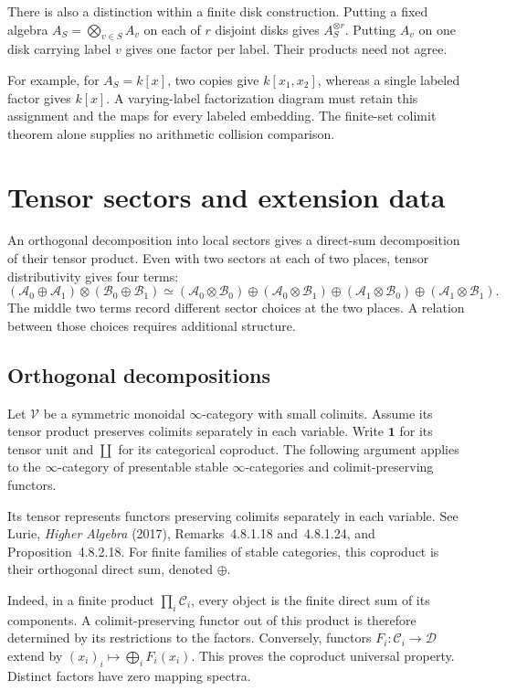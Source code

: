There is also a distinction within a finite disk construction.
Putting a fixed algebra \(A_S=\bigotimes_{v\in S}A_v\) on each of
\(r\) disjoint disks gives \(A_S^{\otimes r}\).
Putting \(A_v\) on one disk carrying label \(v\) gives one factor
per label. Their products need not agree.

For example, for \(A_S=k[x]\), two copies give \(k[x_1,x_2]\),
whereas a single labeled factor gives \(k[x]\).
A varying-label factorization diagram must retain this assignment
and the maps for every labeled embedding.
The finite-set colimit theorem alone supplies no arithmetic
collision comparison.


\section{Tensor sectors and extension data}

An orthogonal decomposition into local sectors gives a direct-sum
decomposition of their tensor product. Even with two sectors
at each of two places, tensor distributivity gives four terms:
\[
 (\mathcal A_0\oplus\mathcal A_1)\otimes
 (\mathcal B_0\oplus\mathcal B_1)
 \simeq
 (\mathcal A_0\otimes\mathcal B_0)\oplus
 (\mathcal A_0\otimes\mathcal B_1)\oplus
 (\mathcal A_1\otimes\mathcal B_0)\oplus
 (\mathcal A_1\otimes\mathcal B_1).
\]
The middle two terms record different sector choices at the two places.
A relation between those choices requires additional structure.

\subsection{Orthogonal decompositions}

Let $\mathcal V$ be a symmetric monoidal $\infty$-category with small
colimits. Assume its tensor product preserves colimits separately in each
variable. Write $\mathbf1$ for its tensor unit and $\coprod$ for its
categorical coproduct. The following argument applies to the
$\infty$-category of presentable stable $\infty$-categories and
colimit-preserving functors.

Its tensor represents functors preserving colimits separately
in each variable. See Lurie, \emph{Higher Algebra} (2017),
Remarks~4.8.1.18 and~4.8.1.24, and Proposition~4.8.2.18.
For finite families of stable categories, this coproduct is their
orthogonal direct sum, denoted $\oplus$.

Indeed, in a finite product $\prod_i\mathcal C_i$, every object is the
finite direct sum of its components. A colimit-preserving functor out of
this product is therefore determined by its restrictions to the factors.
Conversely, functors $F_i:\mathcal C_i\to\mathcal D$ extend by
$(x_i)_i\mapsto\bigoplus_iF_i(x_i)$. This proves the coproduct universal
property. Distinct factors have zero mapping spectra.

